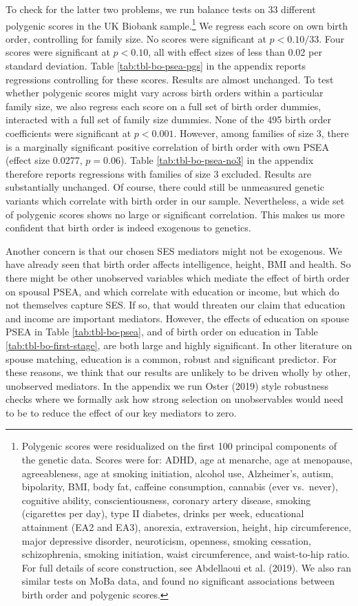 \documentclass[
  12pt,
]{article}
\theoremstyle{definition}
\theoremstyle{definition}
\theoremstyle{definition}
\theoremstyle{definition}
\theoremstyle{remark}
\begin{document}
To check for the latter two problems, we run balance tests on 33 different
polygenic scores in the UK Biobank sample.\footnote{Polygenic scores were residualized on the first 100 principal
  components of the genetic data. Scores were for: ADHD, age at
  menarche, age at menopause, agreeableness, age at smoking
  initiation, alcohol use, Alzheimer's, autism, bipolarity, BMI, body
  fat, caffeine consumption, cannabis (ever vs.~never), cognitive
  ability, conscientiousness, coronary artery disease, smoking
  (cigarettes per day), type II diabetes, drinks per week, educational
  attainment (EA2 and EA3), anorexia, extraversion, height, hip
  circumference, major depressive disorder, neuroticism, openness,
  smoking cessation, schizophrenia, smoking initiation, waist
  circumference, and waist-to-hip ratio. For full details of score
  construction, see Abdellaoui et al. (2019). We also ran similar tests on
  MoBa data, and found no significant associations between birth order
  and polygenic scores.} We regress each score on own
birth order, controlling for family size. No scores were significant at \(p < 0.10/33\). Four scores were significant at \(p < 0.10\), all with effect sizes of
less than 0.02 per standard deviation. Table \ref{tab:tbl-bo-psea-pgs} in the
appendix reports
regressions controlling for these scores. Results are almost unchanged. To test
whether polygenic scores might vary across birth orders within a particular
family size, we also regress each score on a full set of birth order dummies,
interacted with a full set of family size dummies. None of the
495 birth order coefficients were significant at \(p < 0.001\).
However, among families of size 3, there is a marginally significant positive
correlation of birth order with own PSEA (effect size
0.0277, \(p = 0.06\)). Table
\ref{tab:tbl-bo-psea-no3} in the appendix therefore reports regressions with
families of size 3 excluded. Results are substantially unchanged. Of course,
there could still be unmeasured genetic variants which correlate with birth
order in our sample. Nevertheless, a wide set of polygenic scores shows no large
or significant correlation. This makes us more confident that birth order is
indeed exogenous to genetics.

Another concern is that our chosen SES mediators might not be exogenous. We have
already seen that birth order affects intelligence, height, BMI
and health. So there might be other unobserved variables which mediate the effect
of birth order on spousal PSEA, and which correlate with education or income,
but which do not themselves capture SES. If so, that would threaten our claim
that education and income are important mediators. However, the effects of
education on spouse PSEA in Table \ref{tab:tbl-bo-psea}, and of birth order on
education in Table \ref{tab:tbl-bo-first-stage}, are both large and highly
significant. In other literature on spouse matching, education is a common,
robust and significant predictor. For these reasons, we think that our results
are unlikely to be driven wholly by other, unobserved mediators. In the appendix
we run Oster (2019) style robustness checks where we formally ask
how strong selection on unobservables would need to be to reduce the effect of
our key mediators to zero.
\end{document}
